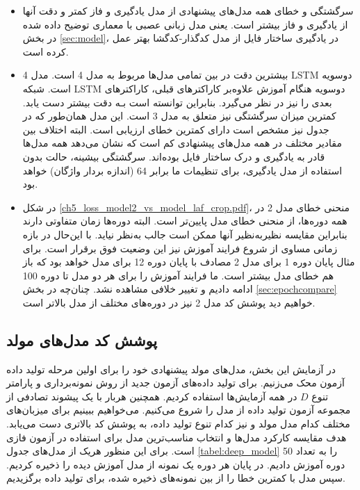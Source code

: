  \begin{itemize}
 	\item{
 سرگشتگی و خطای همه مدل‌های پیشنهادی از مدل یادگیری و فاز کمتر و دقت آنها از یادگیری و فاز بیشتر است. یعنی مدل زبانی عصبی با معماری توضیح داده شده در بخش \ref{sec:model}، در یادگیری ساختار فایل از مدل کدگذار-کدگشا 
 \cite{Godefroid:2017:LML:3155562.3155573}
 بهتر عمل کرده است.  	
 }
\item
{
	بیشترین دقت در بین تمامی مدل‌ها مربوط به مدل 4 است. مدل 4 \gls{LSTM} دوسویه است. شبکه \gls{LSTM} دوسویه هنگام آموزش علاوه‌بر کاراکترهای قبلی، کاراکترهای بعدی را نیز در نظر می‌گیرد. بنابراین توانسته‌ است بـه ‌دقت بیشتر دست یابد. کمترین میزان سرگشتگی نیز متعلق به مدل 3 است. این مدل همان‌طور که در جدول نیز مشخص است دارای کمترین خطای ارزیابی است. البته اختلاف بین مقادیر مختلف در همه مدل‌های پیشنهادی کم است که نشان می‌دهد همه مدل‌ها قادر به یادگیری و درک ساختار فایل بوده‌اند. 
	سرگشتگی بیشینه، حالت بدون استفاده از مدل یادگیری،  برای تنظیمات ما برابر 64 (اندازه بردار واژگان) خواهد بود.
}

\item
{
	در شکل \ref{ch5_loss_model2_vs_model_laf_crop.pdf}، منحنی خطای مدل 2 در همه دوره‌ها، از منحنی خطای مدل  پایین‌تر است. البته دوره‌ها زمان متفاوتی دارند بنابراین مقایسه نظیر‌به‌نظیر آنها ممکن است جالب به‌نظر نیاید. با این‌حال در بازه زمانی مساوی از شروع فرایند آموزش نیز این وضعیت فوق برقرار است. برای مثال پایان دوره‌ 1 برای مدل 2 مصادف با پایان دوره 12 برای مدل  خواهد بود که باز هم خطای مدل   بیشتر است. ما فرایند آموزش را برای هر دو مدل تا دوره 100 ادامه دادیم و تغییر خلافی مشاهده نشد. چنان‌چه در بخش \ref{sec:epochcompare} خواهیم دید پوشش کد مدل 2 نیز در دوره‌های مختلف از مدل  بالاتر است.
}

 \end{itemize}
 
 \subsection{پوشش کد مدل‌های مولد}\label{sec:gen_model_cove}
 
 در آزمایش این بخش، مدل‌های مولد پیشنهادی  خود را برای اولین مرحله تولید داده آزمون محک می‌زنیم. برای تولید داده‌های آزمون جدید از روش نمونه‌برداری و پارامتر تنوع $D$ در همه آزمایش‌ها استفاده کردیم. همچنین هربار با یک پیشوند تصادفی از مجموعه آزمون تولید داده از مدل را شروع می‌کنیم. می‌خواهیم ببینیم برای میزبان‌های مختلف کدام مدل مولد و نیز کدام تنوع تولید داده، به پوشش کد بالاتری دست می‌یابد. هدف مقایسه کارکرد مدل‌ها و انتخاب مناسب‌ترین مدل برای استفاده در آزمون فازی است.
 برای این منظور هریک از مدل‌های جدول \ref{tabel:deep_model} را به تعداد 50 دوره آموزش دادیم. در پایان هر دوره یک نمونه از مدل آموزش دیده را ذخیره کردیم. سپس مدل با کمترین خطا را از بین نمونه‌های ذخیره شده، برای تولید داده برگزیدیم.
 
